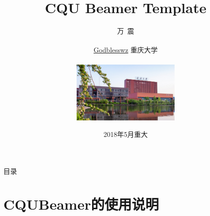 \documentclass[8pt,aspectratio=169,mathserif,UTF8]{beamer}
\begin{document}
\beamertemplatenavigationsymbolsempty
 
\title{ CQU Beamer Template}	     %
\author[万震（重庆大学）]{
万\ 震\\
\vskip5pt
{\color{blue}\faEnvelopeO}\\
{\color{blue}\faGithub}\hspace{0.1cm} {\href{https://github.com/Godblesswz}{Godblesswz}}
\vskip5pt
重庆大学\\
  \begin{center}
  \includegraphics[width=0.4\textwidth]{CQU_Campus_D.jpg}%
  \end{center}
  \vskip-35pt
}

\date[2018年5月]{2018年5月\quad 重大}
 
\begin{frame}[plain]
  \vskip25pt
  \titlepage
\end{frame}
\setcounter{framenumber}{0}				

\section*{}   
\begin{frame}{目录}
  \begin{multicols}{2}
    \tableofcontents[subsubsectionstyle=hide]  
  \end{multicols}
\end{frame}			

\section{CQUBeamer的使用说明}
\end{document}
